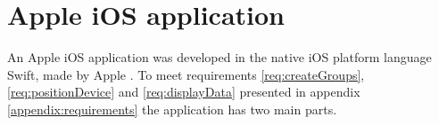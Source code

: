 \section{Apple iOS application}\label{sec:implApp}
An Apple iOS application was developed in the native iOS platform language Swift, made by Apple \cite{SwiftOrg}.
To meet requirements \ref{req:createGroups}, \ref{req:positionDevice} and \ref{req:displayData} presented in appendix \ref{appendix:requirements} the application has two main parts.


% 


